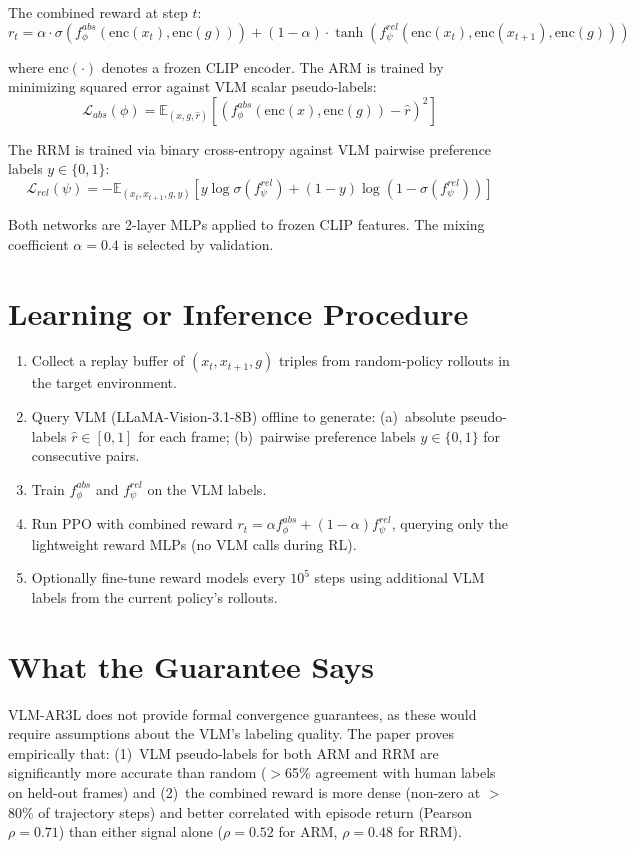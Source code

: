 \documentclass[10pt,twocolumn]{article}
\begin{document}
The combined reward at step $t$:
\[
r_t = \alpha \cdot \sigma\!\left(f_\phi^{abs}(\text{enc}(x_t), \text{enc}(g))\right)
+ (1-\alpha)\cdot\tanh\!\left(f_\psi^{rel}(\text{enc}(x_t),\text{enc}(x_{t+1}),\text{enc}(g))\right)
\]

where $\text{enc}(\cdot)$ denotes a frozen CLIP encoder. The ARM is
trained by minimizing squared error against VLM scalar pseudo-labels:
\[
\mathcal{L}_{abs}(\phi) = \mathbb{E}_{(x,g,\hat{r})}\!
\left[\left(f_\phi^{abs}(\text{enc}(x),\text{enc}(g)) - \hat{r}\right)^2\right]
\]

The RRM is trained via binary cross-entropy against VLM pairwise
preference labels $y \in \{0,1\}$:
\[
\mathcal{L}_{rel}(\psi) = -\mathbb{E}_{(x_t,x_{t+1},g,y)}\!
\left[y\log\sigma(f_\psi^{rel}) + (1-y)\log(1-\sigma(f_\psi^{rel}))\right]
\]

Both networks are 2-layer MLPs applied to frozen CLIP features. The
mixing coefficient $\alpha = 0.4$ is selected by validation.

\section{Learning or Inference Procedure}

\begin{enumerate}[itemsep=2pt,parsep=0pt]
  \item Collect a replay buffer of $(x_t, x_{t+1}, g)$ triples from
    random-policy rollouts in the target environment.
  \item Query VLM (LLaMA-Vision-3.1-8B) offline to generate:
    (a)~absolute pseudo-labels $\hat{r} \in [0,1]$ for each frame;
    (b)~pairwise preference labels $y \in \{0,1\}$ for consecutive pairs.
  \item Train $f_\phi^{abs}$ and $f_\psi^{rel}$ on the VLM labels.
  \item Run PPO with combined reward $r_t = \alpha f_\phi^{abs} + (1-\alpha) f_\psi^{rel}$,
    querying only the lightweight reward MLPs (no VLM calls during RL).
  \item Optionally fine-tune reward models every $10^5$ steps using
    additional VLM labels from the current policy's rollouts.
\end{enumerate}

\section{What the Guarantee Says}

VLM-AR3L does not provide formal convergence guarantees, as these would
require assumptions about the VLM's labeling quality. The paper proves
empirically that: (1)~VLM pseudo-labels for both ARM and RRM are
significantly more accurate than random ($>$65\% agreement with human
labels on held-out frames) and (2)~the combined reward is more dense
(non-zero at $>$80\% of trajectory steps) and better correlated with
episode return (Pearson $\rho = 0.71$) than either signal alone
($\rho = 0.52$ for ARM, $\rho = 0.48$ for RRM).
\end{document}
